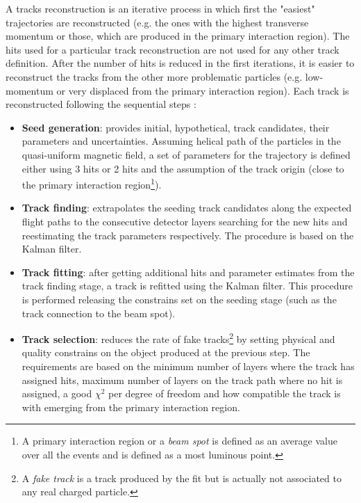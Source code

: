 A tracks reconstruction is an iterative process in which first the "easiest" trajectories are reconstructed (e.g. the ones with the highest
transverse momentum or those, which are produced in the primary interaction region). The hits used for a particular track reconstruction 
are not used for any other track definition. After the number of hits is reduced in the first iterations, it is easier to reconstruct the
tracks from the other more problematic particles (e.g. low-momentum or very displaced from the primary interaction region). Each track is reconstructed
following the sequential steps \cite{Chatrchyan:2014fea}:

\begin{itemize}
 \item \textbf{Seed generation}: provides initial, hypothetical, track candidates, their parameters and uncertainties. Assuming helical path of the particles in the
 quasi-uniform magnetic field, a set of parameters for the trajectory is defined either using 3 hits or 2 hits and the assumption
 of the track origin (close to the primary interaction region\footnote{A primary interaction region or a \textit{beam spot} is defined 
 as an average value over all the events and is defined as a most luminous point.}).
 \item \textbf{Track finding}: extrapolates the seeding track candidates along the expected flight paths to the consecutive detector layers searching 
 for the new hits and reestimating the track parameters respectively. The procedure is based on the Kalman filter\cite{Fruhwirth:1987fm}.
 \item \textbf{Track fitting}: after getting additional hits and parameter estimates from the track finding stage, a track is refitted using the 
 Kalman filter. This procedure is performed releasing the constrains set on the seeding stage (such as the track connection to the beam spot).
 \item \textbf{Track selection}: reduces the rate of fake tracks\footnote{A \textit{fake track} is a track produced by the fit but is actually not 
 associated to any real charged particle.} by setting physical and quality constrains on the object produced at the previous step. The requirements
 are based on the minimum number of layers where the track has assigned hits, maximum number of layers on the track path where no hit is assigned,
 a good $\chi^{2}$ per degree of freedom and how compatible the track is with emerging from the primary interaction region.
 
\end{itemize}


